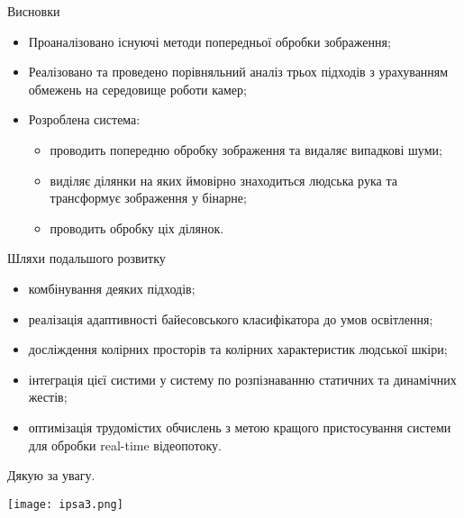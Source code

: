 \begin{frame}{Висновки}
	\manimate
	\begin{itemize}
		\item Проаналізовано існуючі методи попередньої обробки зображення;
		\item Реалізовано та проведено порівняльний аналіз трьох підходів з урахуванням обмежень на середовище роботи камер;
		\item Розроблена система:
		\begin{itemize}
			\item проводить попередню обробку зображення та видаляє випадкові шуми;
			\item виділяє ділянки на яких ймовірно знаходиться людська рука та трансформує зображення у бінарне;
			\item проводить обробку ціх ділянок.
		\end{itemize}
	\end{itemize}
\end{frame}

\begin{frame}{Шляхи подальшого розвитку}
	\manimate
	\begin{itemize}
		\item комбінування деяких підходів;
		\item реалізація адаптивності байесовського класифікатора до умов освітлення;
		\item досліждення колірних просторів та колірних характеристик людської шкіри;
		\item інтеграція цієї систими у систему по розпізнаванню статичних та динамічних жестів;
		\item оптимізація трудомістих обчислень з метою кращого пристосування системи для обробки real-time відеопотоку.
	\end{itemize}
\end{frame}


\begin{frame}
	\manimate
	\centering
	\Large Дякую за увагу.
	
	\begin{center}
		\texttt{[image: ipsa3.png]}
	\end{center}
\end{frame}